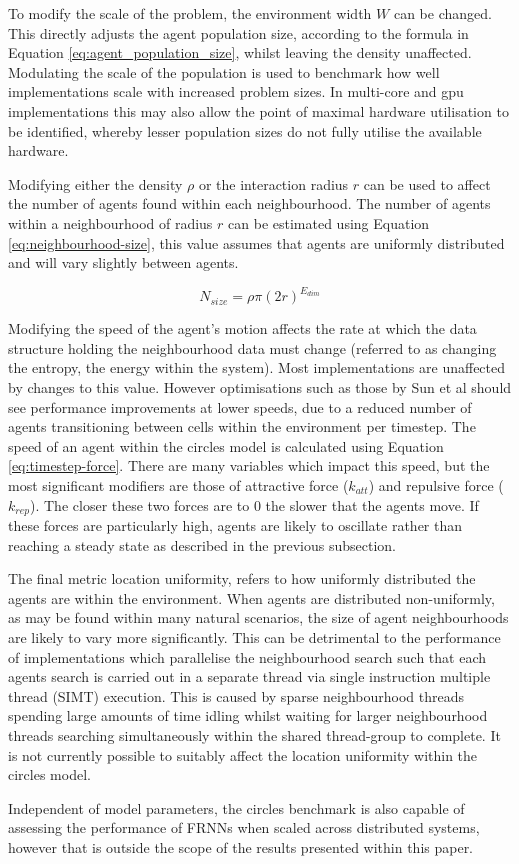     To modify the scale of the problem, the environment width $W$ can be changed. This directly adjusts the agent population size, according to the formula in Equation \ref{eq:agent_population_size}, whilst leaving the density unaffected. Modulating the scale of the population is used to benchmark how well implementations scale with increased problem sizes. In multi-core and \gls{gpu} implementations this may also allow the point of maximal hardware utilisation to be identified, whereby lesser population sizes do not fully utilise the available hardware.
    
    Modifying either the density $\rho$ or the interaction radius $r$ can be used to affect the number of agents found within each neighbourhood. The number of agents within a neighbourhood of radius $r$ can be estimated using Equation \ref{eq:neighbourhood-size}, this value assumes that agents are uniformly distributed and will vary slightly between agents.
    
    \begin{equation}\label{eq:neighbourhood-size}
        N_{size} = \rho \pi (2r)^{E_{dim}}
    \end{equation}
      
    Modifying the speed of the agent's motion affects the rate at which the data structure holding the neighbourhood data must change (referred to as changing the entropy, the energy within the system). Most implementations are unaffected by changes to this value. However optimisations such as those by Sun et al \cite{HY*15} should see performance improvements at lower speeds, due to a reduced number of agents transitioning between cells within the environment per timestep. The speed of an agent within the circles model is calculated using Equation \ref{eq:timestep-force}. There are many variables which impact this speed, but the most significant modifiers are those of attractive force ($k_{att}$) and repulsive force ($k_{rep}$). The closer these two forces are to $0$ the slower that the agents move. If these forces are particularly high, agents are likely to oscillate rather than reaching a steady state as described in the previous subsection.
    
    The final metric location uniformity, refers to how uniformly distributed the agents are within the environment. When agents are distributed non-uniformly, as may be found within many natural scenarios, the size of agent neighbourhoods are likely to vary more significantly. This can be detrimental to the performance of implementations which parallelise the neighbourhood search such that each agents search is carried out in a separate thread via single instruction multiple thread (SIMT) execution. This is caused by sparse neighbourhood threads spending large amounts of time idling whilst waiting for larger neighbourhood threads searching simultaneously within the shared thread-group to complete. It is not currently possible to suitably affect the location uniformity within the circles model.
    
    Independent of model parameters, the circles benchmark is also capable of assessing the performance of FRNNs when scaled across distributed systems, however that is outside the scope of the results presented within this paper.